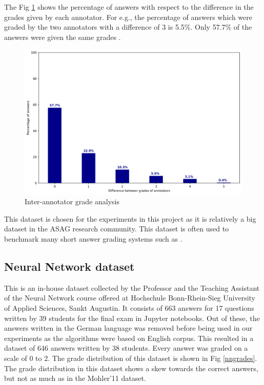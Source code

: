 	The Fig \ref{mohlerdisagreement} shows the percentage of answers with respect to the difference in the grades given by each annotator. For e.g., the percentage of answers which were graded by the two annotators with a difference of 3 is 5.5\%. Only 57.7\% of the answers were given the same grades \cite{Mohler2011}.  

	\begin{figure}[h]
		\centering
		\includegraphics[scale=0.3]{images/mohlerdisagreement}
		\caption{Inter-annotator grade analysis \cite{Mohler2011}}
		\label{mohlerdisagreement}
	\end{figure}
	
	This dataset is chosen for the experiments in this project as it is relatively a big dataset in the ASAG research community. This dataset is often used to benchmark many short answer grading systems such as \cite{Sultan2016} \cite{Mohler2011} \cite{Ramachandran2015}.

	\subsection{Neural Network dataset}

	This is an in-house dataset collected by the Professor and the Teaching Assistant of the Neural Network course offered at Hochschule Bonn-Rhein-Sieg University of Applied Sciences, Sankt Augustin. It consists of 663 answers for 17 questions written by 39 students for the final exam in Jupyter notebooks. Out of these, the answers written in the German language was removed before being used in our experiments as the algorithms were based on English corpus. This resulted in a dataset of 646 answers written by 38 students. Every answer was graded on a scale of 0 to 2. The grade distribution of this dataset is shown in Fig \ref{nngrades}. The grade distribution in this dataset shows a skew towards the correct answers, but not as much as in the Mohler'11 dataset.

